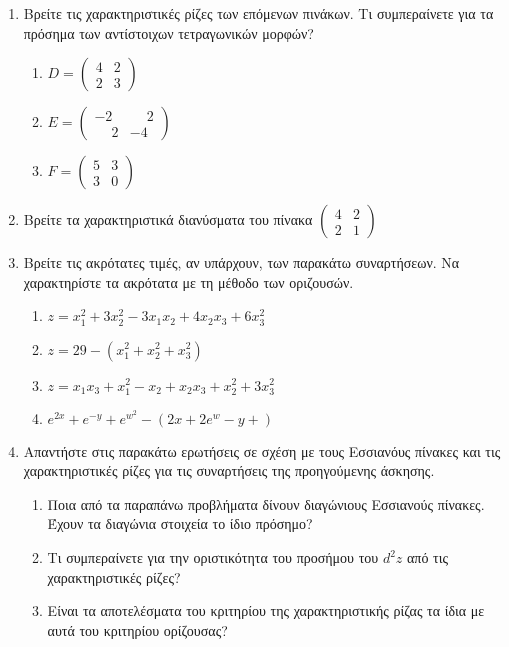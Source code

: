 \documentclass[a4paper,12pt]{article}
\begin{document}
\begin{enumerate}
\item Βρείτε τις χαρακτηριστικές ρίζες των επόμενων πινάκων. Τι συμπεραίνετε για τα πρόσημα των αντίστοιχων τετραγωνικών μορφών?

\begin{enumerate}
\item $D=
\begin{pmatrix}
4 & 2\\
2 & 3
\end{pmatrix}$
\item $E=
\begin{pmatrix}
-2 & \phantom{-}2\\
\phantom{-}2 & -4
\end{pmatrix}$
\item $F=
\begin{pmatrix}
5 & 3\\
3 & 0
\end{pmatrix}$

\end{enumerate}

\item Βρείτε τα χαρακτηριστικά διανύσματα του πίνακα $\begin{pmatrix}
4 & 2\\
2 & 1
\end{pmatrix}$

\item Βρείτε τις ακρότατες τιμές, αν υπάρχουν, των παρακάτω συναρτήσεων. Να χαρακτηρίστε τα ακρότατα με τη μέθοδο των οριζουσών.

\begin{enumerate}
\item $z=x_1^2+3x_2^2-3x_1x_2+4x_2x_3+6x_3^2$
\item $z=29 - (x_1^2+x_2^2+x_3^2)$
\item $z=x_1x_3 + x_1^2-x_2 + x_2x_3+x_2^2+3x_3^2$
\item $e^{2x}+e^{-y}+e^{w^2}-(2x+2e^w-y+)$
\end{enumerate}

\item Απαντήστε στις παρακάτω ερωτήσεις σε σχέση με τους Εσσιανόυς πίνακες και τις χαρακτηριστικές ρίζες για τις συναρτήσεις της προηγούμενης άσκησης.

\begin{enumerate}
\item Ποια από τα παραπάνω προβλήματα δίνουν διαγώνιους Εσσιανούς πίνακες. Έχουν τα διαγώνια στοιχεία το ίδιο πρόσημο?
\item Τι συμπεραίνετε για την οριστικότητα του προσήμου του $d^2z$ από τις χαρακτηριστικές ρίζες?
\item  Είναι τα αποτελέσματα του κριτηρίου της χαρακτηριστικής ρίζας τα ίδια με αυτά του κριτηρίου ορίζουσας?
\end{enumerate}


\end{enumerate}
\end{document}
